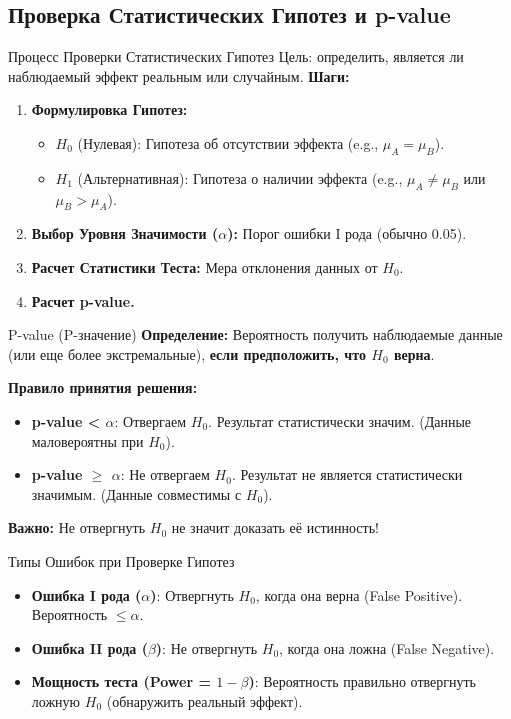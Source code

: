 \subsection{Проверка Статистических Гипотез и p-value}
\begin{myblock}{Процесс Проверки Статистических Гипотез}
Цель: определить, является ли наблюдаемый эффект реальным или случайным.
\textbf{Шаги:}
\begin{enumerate}[nosep, leftmargin=*]
    \item \textbf{Формулировка Гипотез:}
        \begin{itemize}
            \item $H_0$ (Нулевая): Гипотеза об отсутствии эффекта (e.g., $\mu_A = \mu_B$).
            \item $H_1$ (Альтернативная): Гипотеза о наличии эффекта (e.g., $\mu_A \neq \mu_B$ или $\mu_B > \mu_A$).
        \end{itemize}
    \item \textbf{Выбор Уровня Значимости ($\alpha$):} Порог ошибки I рода (обычно 0.05).
    \item \textbf{Расчет Статистики Теста:} Мера отклонения данных от $H_0$.
    \item \textbf{Расчет p-value.}
\end{enumerate}
\end{myblock}

\begin{textbox}{{P-value (P-значение)}}
    \textbf{Определение:} Вероятность получить наблюдаемые данные (или еще более экстремальные), \textbf{если предположить, что $H_0$ верна}.

    \textbf{Правило принятия решения:}
    \begin{itemize}[nosep, leftmargin=*]
        \item \textbf{p-value < $\alpha$}: Отвергаем $H_0$. Результат статистически значим. (Данные маловероятны при $H_0$).
        \item \textbf{p-value $\ge$ $\alpha$}: Не отвергаем $H_0$. Результат не является статистически значимым. (Данные совместимы с $H_0$).
    \end{itemize}
    \textbf{Важно:} Не отвергнуть $H_0$ не значит доказать её истинность!
\end{textbox}

\begin{myblock}{Типы Ошибок при Проверке Гипотез}
\begin{itemize}[nosep, leftmargin=*]
    \item \textbf{Ошибка I рода ($\alpha$)}: Отвергнуть $H_0$, когда она верна (False Positive). Вероятность $\le \alpha$.
    \item \textbf{Ошибка II рода ($\beta$)}: Не отвергнуть $H_0$, когда она ложна (False Negative).
    \item \textbf{Мощность теста (Power = $1-\beta$)}: Вероятность правильно отвергнуть ложную $H_0$ (обнаружить реальный эффект).
\end{itemize}
\end{myblock}

